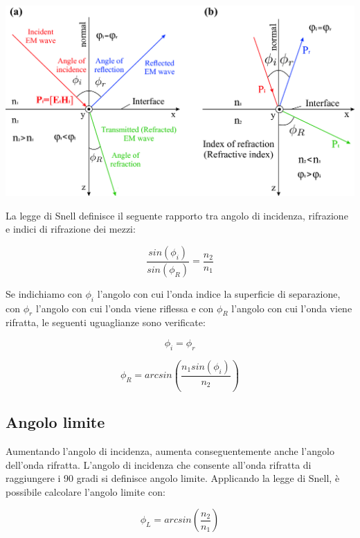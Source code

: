 \documentclass{article}
\begin{document}
    \begin{center}
        \includegraphics[width=\textwidth]{angolo-di-riflessione.png}
    \end{center}

    La legge di Snell definisce il seguente rapporto tra angolo di incidenza, rifrazione e indici di rifrazione dei mezzi:

    \begin{equation}
        \frac{sin(\phi_i)}{sin(\phi_R)} = \frac{n_2}{n_1}
    \end{equation}

    Se indichiamo con $\phi_i$ l'angolo con cui l'onda indice la superficie di separazione, con $\phi_r$ l'angolo con cui l'onda
    viene riflessa e con $\phi_R$ l'angolo con cui l'onda viene rifratta, le seguenti uguaglianze sono verificate:

    \begin{equation}
        \phi_i = \phi_r
    \end{equation}

    \begin{equation}
        \phi_R = arcsin(\frac{n_1 sin(\phi_i)}{n_2})
    \end{equation}

    \subsection{Angolo limite}

    Aumentando l'angolo di incidenza, aumenta conseguentemente anche l'angolo dell'onda rifratta. L'angolo di incidenza che consente
    all'onda rifratta di raggiungere i 90 gradi si definisce angolo limite. Applicando la legge di Snell, è possibile calcolare
    l'angolo limite con:

    \begin{equation}
        \phi_L = arcsin(\frac{n_2}{n_1})
    \end{equation}
\end{document}
